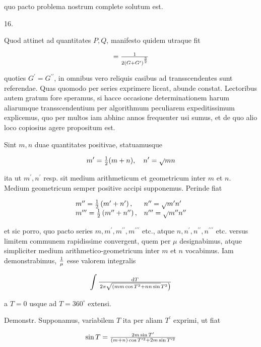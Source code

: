\documentclass[twoside,12pt, showframe]{memoir}
\let\oldfrac\frac
\def\frac#1#2{\mathchoice{\tfrac{#1}{#2}}{\oldfrac{#1}{#2}}{\genfrac{}{}{}{2}{#1}{#2\mathstrut}}{\genfrac{}{}{}{3}{#1}{#2\mathstrut}}}
\begin{document}
quo pacto problema nostrum complete solutum est.

16.

Quod attinet ad quantitates \(P, Q\), manifesto quidem utraque fit

\[
=\frac{1}{2\left(G+G^{\prime}\right)^{\frac{3}{2}}}
\]

quoties \(G^{\prime}=G^{\prime \prime}\), in omnibus vero reliquis casibus ad transscendentes sunt referendae. Quas quomodo per series exprimere liceat, abunde constat. Lectoribus autem gratum fore speramus, si hacce occasione determinationem harum aliarumque transscendentium per algorithmum peculiarem expeditissimum explicemus, quo per multos iam abhinc annos frequenter usi sumus, et de quo alio loco copiosius agere propositum est.

Sint \(m, n\) duae quantitates positivae, statuamusque

\[
m^{\prime}=\frac{1}{2}(m+n), \quad n^{\prime}=\sqrt{ } m n
\]

ita ut \(m^{\prime}, n^{\prime}\) resp. sit medium arithmeticum et geometricum inter \(m\) et \(n\). Medium geometricum semper positive accipi supponemus. Perinde fiat

\[
\begin{array}{ll}
m^{\prime \prime}=\frac{1}{2}\left(m^{\prime}+n^{\prime}\right), & n^{\prime \prime}=\sqrt{ } m^{\prime} n^{\prime} \\
m^{\prime \prime \prime}=\frac{1}{2}\left(m^{\prime \prime}+n^{\prime \prime}\right), & n^{\prime \prime \prime}=\sqrt{ } m^{\prime \prime} n^{\prime \prime}
\end{array}
\]

et sic porro, quo pacto series \(m, m^{\prime}, m^{\prime \prime}, m^{\prime \prime \prime}\) etc., atque \(n, n^{\prime}, n^{\prime \prime}, n^{\prime \prime \prime}\) etc. versus limitem communem rapidissime convergent, quem per \(\mu\) designabimus, atque simpliciter medium arithmetico-geometricum inter \(m\) et \(n\) vocabimus. Iam demonstrabimus, \(\frac{1}{\mu}\) esse valorem integralis

\[
\int \frac{\mathrm{d} T}{\left.2 \pi \sqrt{\left(m m \cos T^{2}+n n \sin \right.} T^{2}\right)}
\]

a \(T=0\) usque ad \(T=360^{\circ}\) extensi.

Demonstr. Supponamus, variabilem \(T\) ita per aliam \(T^{\prime}\) exprimi, ut fiat

\[
\sin T=\frac{2 m \sin T^{\prime}}{(m+n) \cos T^{\prime 2}+2 m \sin T^{\prime 2}}
\]
\end{document}
